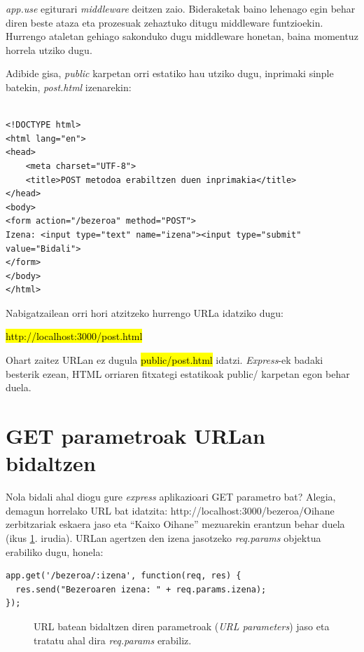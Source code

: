 \textit{app.use} egiturari \textit{middleware} deitzen zaio. Bideraketak baino lehenago egin behar diren beste ataza eta prozesuak zehaztuko ditugu middleware funtzioekin. Hurrengo ataletan gehiago sakonduko dugu middleware honetan, baina momentuz horrela utziko dugu.

Adibide gisa, \textit{public} karpetan orri estatiko hau utziko dugu, inprimaki sinple batekin, \textit{post.html} izenarekin:

\begin{lstlisting}

<!DOCTYPE html>
<html lang="en">
<head>
	<meta charset="UTF-8">
	<title>POST metodoa erabiltzen duen inprimakia</title>
</head>
<body>
<form action="/bezeroa" method="POST">
Izena: <input type="text" name="izena"><input type="submit" value="Bidali">
</form>
</body>
</html>
\end{lstlisting}

Nabigatzailean orri hori atzitzeko hurrengo URLa idatziko dugu:

\hl{http://localhost:3000/post.html}

Ohart zaitez URLan ez dugula \hl{public/post.html} idatzi. \textit{Express}-ek badaki besterik ezean, HTML orriaren fitxategi estatikoak public/ karpetan egon behar duela.

\section{GET parametroak URLan bidaltzen}

Nola bidali ahal diogu gure \textit{express} aplikazioari GET parametro bat? Alegia, demagun horrelako URL bat idatzita: http://localhost:3000/bezeroa/Oihane zerbitzariak eskaera jaso eta ``Kaixo Oihane'' mezuarekin erantzun behar duela (ikus \ref{fig:urlparametroak}. irudia). URLan agertzen den izena jasotzeko \textit{req.params} objektua erabiliko dugu, honela:

\begin{lstlisting}
app.get('/bezeroa/:izena', function(req, res) {
  res.send("Bezeroaren izena: " + req.params.izena);
});
\end{lstlisting}

\begin{figure}[ht]
	\centering
{}
\caption{URL batean bidaltzen diren parametroak (\textit{URL parameters}) jaso eta tratatu ahal dira \textit{req.params} erabiliz.}
\label{fig:urlparametroak}
\end{figure}


